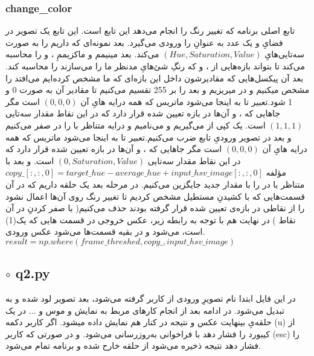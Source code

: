 \documentclass[a4paper,12pt]{article}
\begin{document}
  \subsubsection*{change\_color}
  تابع اصلی برنامه که تغییر رنگ را انجام می‌دهد این تابع است. این تابع یک تصویر در فضایِ 
  و یک عدد به عنوانِ
  را ورودی می‌گیرد. بعد نمونه‌ای که داریم را به صورت سه‌تایی‌هایِ 
   $ (Hue
  ,
  Saturation
  ,
  Value) $
  می‌کند. بعد مینیمم و ماکزیممِ
  ،
  و 
  را محاسبه می‌کند تا بتواند بازه‌هایی از 
  ،
  و 
  که رنگِ شئ‌هایِ مدنظر ما را می‌سازند را محاسبه کند. بعد آن پیکسل‌هایی که مقادیرشون داخل این بازه‌ای که ما مشخص کرده‌ایم می‌افتد را مشخص میکنیم و در 
  میریزیم و بعد 
  را بر 255 تقسیم می‌کنیم تا مقادیر آن به صورت 0 و 1 شود.تعبیر 
  تا به اینجا می‌شود ماتریس که همه درایه هایِ آن
  $ (0, 0, 0) $
   است مگر جاهایی که 
  ،
  و 
  آن‌ها در بازه تعیین شده قرار دارد که در این نقاط مقدار
  سه‌تایی‌ 
  $ (1, 1, 1) $
  است. یک کپی از 
  می‌گیریم و 
  می‌نامیم و درایه متناظر با 
  را در 
  صفر می‌کنیم و بعد در تصویر ورودیِ تابع ضرب می‌کنیم.تعبیر 
  تا به اینجا می‌شود ماتریس که همه درایه هایِ آن
  $ (0, 0, 0) $
  است مگر جاهایی که 
  ،
  و 
  آن‌ها در بازه تعیین شده قرار دارد که در این نقاط مقدار
  سه‌تایی‌ 
  $ (0, Saturation, Value) $
  است. و بعد با \\
  $ copy\_[:, :, 0] = target\_hue - average\_hue + input\_hsv\_image[:, :, 0] $
  مؤلفه متناظر با 
  در 
  را با مقدار جدید جایگزین می‌کنیم. در مرحله بعد یک حلقه داریم که در آن قسمت‌هایی که با کشیدنِ مستطیل مشخص کردیم تا تغییر رنگ روی آن‌ها اعمال نشود را از نقاطی در بازه‌ی تعیین شده قرار گرفته بودند حذف می‌کنیم( با صفر کردنِ
  در آن نقاط
  )
  در نهایت هم با توجه به رابطه زیر، عکس خروجی در قسمت هایی که
  یک(1) است، می‌شود 
  و در بقیه قسمت‌ها می‌شود عکس ورودی.
   \\
  $ result = np.where(frame\_threshed, copy\_, input\_hsv\_image) $
  \subsection*{$\circ$ q2.py}
  در این فایل ابتدا نام تصویرِ ورودی از کاربر گرفته ‌می‌شود، بعد تصویر لود شده و به 
  تبدیل می‌شود. در ادامه بعد از انجام کارهای مربط به نمایش و موس و 
  $\dots$
  در یک حلقه‌یِ بینهایت عکس و نتیجه در کنار هم نمایش داده میشود. اگر کاربر دکمه
  \lr(u)
  از کیبورد را فشار دهد 
  با فراخوانی 
  به‌روزرسانی می‌شود.
  و در صورتی که کاربر 
  \lr(esc)
  را فشار دهد نتیجه ذخیره می‌شود از حلقه خارح شده و برنامه تمام می‌شود. 
  
  
  
\end{document}
